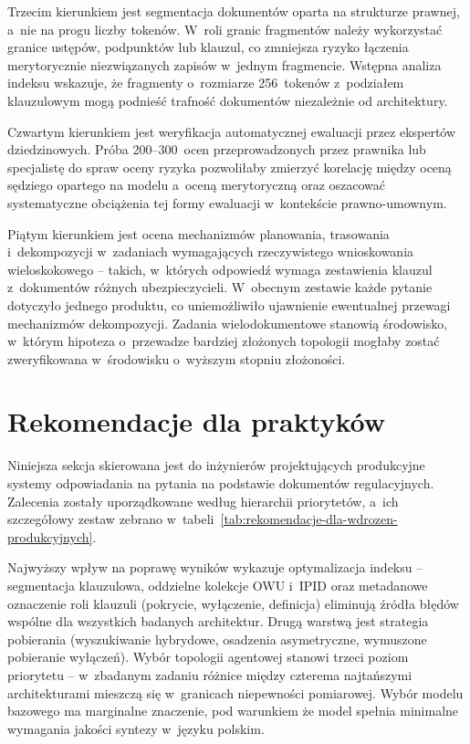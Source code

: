 Trzecim kierunkiem jest segmentacja dokumentów oparta na strukturze prawnej,
a~nie na progu liczby tokenów. W~roli granic fragmentów należy wykorzystać
granice ustępów, podpunktów lub klauzul, co zmniejsza ryzyko łączenia
merytorycznie niezwiązanych zapisów w~jednym fragmencie. Wstępna analiza
indeksu wskazuje, że fragmenty o~rozmiarze 256~tokenów z~podziałem klauzulowym
mogą podnieść trafność dokumentów niezależnie od architektury.

Czwartym kierunkiem jest weryfikacja automatycznej ewaluacji przez ekspertów
dziedzinowych. Próba 200--300~ocen przeprowadzonych przez prawnika lub
specjalistę do spraw oceny ryzyka pozwoliłaby zmierzyć korelację między oceną
sędziego opartego na modelu a~oceną merytoryczną oraz oszacować systematyczne
obciążenia tej formy ewaluacji w~kontekście prawno-umownym.

Piątym kierunkiem jest ocena mechanizmów planowania, trasowania i~dekompozycji
w~zadaniach wymagających rzeczywistego wnioskowania wieloskokowego -- takich,
w~których odpowiedź wymaga zestawienia klauzul z~dokumentów różnych
ubezpieczycieli. W~obecnym zestawie każde pytanie dotyczyło jednego produktu,
co uniemożliwiło ujawnienie ewentualnej przewagi mechanizmów dekompozycji.
Zadania wielodokumentowe stanowią środowisko, w~którym hipoteza o~przewadze
bardziej złożonych topologii mogłaby zostać zweryfikowana w~środowisku
o~wyższym stopniu złożoności.

\section{Rekomendacje dla praktyków}\label{sec:rekomendacje-dla-praktykow}

Niniejsza sekcja skierowana jest do inżynierów projektujących produkcyjne
systemy odpowiadania na pytania na podstawie dokumentów regulacyjnych.
Zalecenia zostały uporządkowane według hierarchii priorytetów, a~ich
szczegółowy zestaw zebrano
w~tabeli~\ref{tab:rekomendacje-dla-wdrozen-produkcyjnych}.

Najwyższy wpływ na poprawę wyników wykazuje optymalizacja indeksu --
segmentacja klauzulowa, oddzielne kolekcje OWU i~IPID oraz metadanowe
oznaczenie roli klauzuli (pokrycie, wyłączenie, definicja) eliminują źródła
błędów wspólne dla wszystkich badanych architektur. Drugą warstwą jest
strategia pobierania (wyszukiwanie hybrydowe, osadzenia asymetryczne, wymuszone
pobieranie wyłączeń). Wybór topologii agentowej stanowi trzeci poziom
priorytetu -- w~zbadanym zadaniu różnice między czterema najtańszymi
architekturami mieszczą się w~granicach niepewności pomiarowej. Wybór modelu
bazowego ma marginalne znaczenie, pod warunkiem że model spełnia minimalne
wymagania jakości syntezy w~języku polskim.

